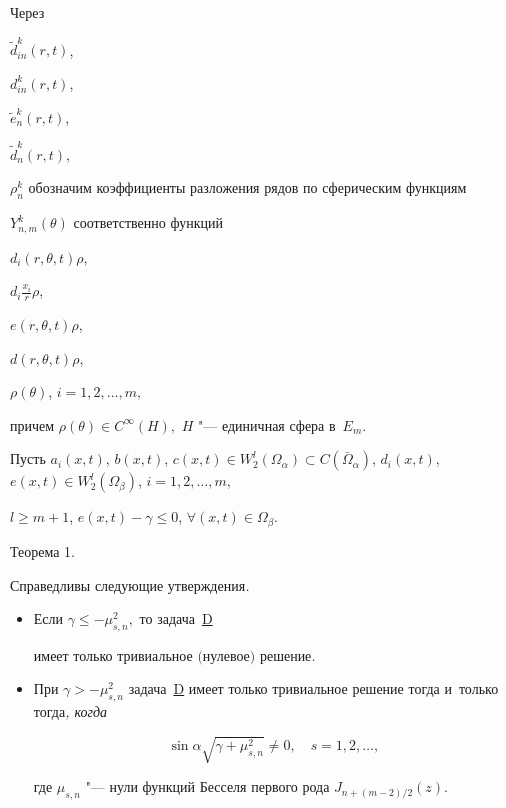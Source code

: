 Через 

$\widetilde{d}_{in}^k(r,t)$, 

$d_{in}^k(r,t)$,

$\widetilde{e}_n^k(r,t)$,

$\widetilde{d}_n^k(r,t)$, 

$\rho_n^k$  обозначим коэффициенты разложения рядов по сферическим функциям

$Y_{n,m}^{k}(\theta )$ соответственно функций

$d_i(r,\theta,t)\rho$,

$d_i\frac{x_i}{r}\rho$, 

$e(r,\theta,t)\rho$, 

$d(r,\theta,t)\rho$, 

$\rho(\theta)$, $i=1,2, \dots , m,$

причем $\rho(\theta)\in C^\infty (H),$ $H$ "--- единичная сфера в~$E_m.$



Пусть $a_i(x,t)$, $b(x,t)$, $c(x,t)\in W_2^l(\Omega_\alpha)\subset C

(\bar{\Omega}_\alpha)$, $d_i(x,t)$, $e(x,t)\in W_2^l(\Omega_\beta)$, $i = 1,2,\dots ,m$, 

$ l\geq m+1$, $e(x,t)-\gamma\leq 0$, $\forall(x,t)\in \Omega_\beta.$









\pagebreak



\hypertarget{ald:th1}{}



{\small\sc Теорема 1.}  \em

Справедливы следующие утверждения\em. \em

\begin{itemize}

\item[\rm 1.] Если $\gamma \leq -\mu_{s,n}^2,$ то задача~\hyperlink{ald:taskD}{{\small \sc D}}

имеет только тривиальное $($нулевое$)$ решение\em. \em 

\item[\rm 2.] При $\gamma > -\mu_{s,n}^2$  задача~\hyperlink{ald:taskD}{{\small \sc D}} имеет только тривиальное решение тогда и~только тогда\em, \em когда

 $$

\sin \alpha \sqrt{\gamma+\mu_{s,n}^2}\neq 0,\quad s=1, 2,\dots,

 $$

где  $\mu_{s,n}  $ "--- нули функций Бесселя первого рода $J_{n+{(m-2)}/{2}}(z).$ \rm



\end{itemize}




